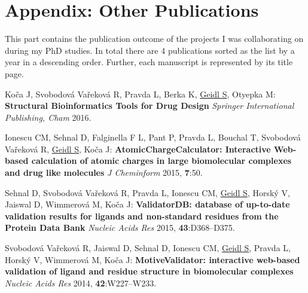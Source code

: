 \chapter{Appendix: Other Publications}
\label{chapter:publications}

This part contains the publication outcome of the projects I was collaborating
on during my PhD studies. In total there are 4 publications sorted as the list
by a year in a descending order. Further, each manuscript is represented by
its title page.

\vspace{5mm}

Koča J, Svobodová Vařeková R, Pravda L, Berka K, \underline{Geidl S}, Otyepka M:
\textbf{Structural Bioinformatics Tools for Drug Design}
\textit{Springer International Publishing, Cham} 2016.

\vspace{5mm}

Ionescu CM, Sehnal D, Falginella F L, Pant P, Pravda L, Bouchal T,
Svobodová Vařeková R, \underline{Geidl S}, Koča J: 
\textbf{AtomicChargeCalculator: Interactive Web-based calculation of atomic
charges in large biomolecular complexes and drug like molecules}
\textit{J Cheminform} 2015, \textbf{7}:50.

\vspace{5mm}

Sehnal D, Svobodová Vařeková R, Pravda L, Ionescu CM, \underline{Geidl S},
Horský V, Jaiswal D, Wimmerová M, Koča J: \textbf{ValidatorDB: database of up-to-date
validation results for ligands and non-standard residues from the Protein Data Bank}
\textit{Nucleic Acids Res} 2015, \textbf{43}:D368--D375.

\vspace{5mm}

Svobodová Vařeková R, Jaiswal D, Sehnal D, Ionescu CM, \underline{Geidl S},
Pravda L, Horský V, Wimmerová M, Koča J: \textbf{MotiveValidator: interactive
web-based validation of ligand and residue structure in biomolecular complexes}
\textit{Nucleic Acids Res} 2014, \textbf{42}:W227--W233.

\clearpage

